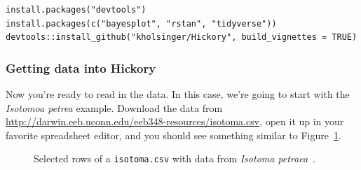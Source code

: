 \documentclass[12pt]{article}
\begin{document}
\begin{verbatim}
install.packages("devtools")
install.packages(c("bayesplot", "rstan", "tidyverse"))
devtools::install_github("kholsinger/Hickory", build_vignettes = TRUE)
\end{verbatim}

\subsubsection*{Getting data into Hickory}

Now you're ready to read in the data. In this case, we're going to
start with the {\it Isotomoa petrea\/} example. Download the data from
\url{http://darwin.eeb.uconn.edu/eeb348-resources/isotoma.csv}, open
it up in your favorite spreadsheet editor, and you should see
something similar to Figure~\ref{fig:isotoma-csv}.

\begin{figure}
  \begin{center}
  \end{center}
\caption{Selected rows of a {\tt isotoma.csv} with data from {\it
    Isotoma petraea}~\cite{James-etal-1983}.}\label{fig:isotoma-csv}
\end{figure}
\end{document}
